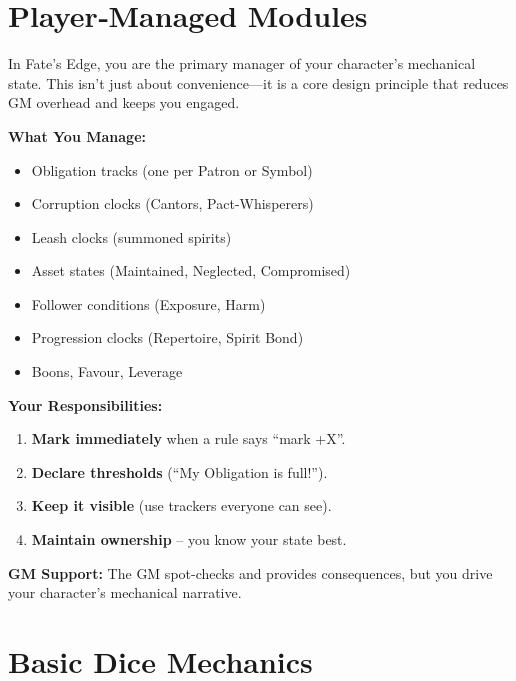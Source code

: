 \section{Player‑Managed Modules}
\label{sec:player-managed-modules}

In Fate’s Edge, you are the primary manager of your character’s mechanical state. This isn’t just about convenience—it is a core design principle that reduces GM overhead and keeps you engaged.

\begin{tcolorbox}[colback=black!3!white,colframe=black!40!white,title=You Track Your Own Story]
\textbf{What You Manage:}
\begin{itemize}
    \item Obligation tracks (one per Patron or Symbol)
    \item Corruption clocks (Cantors, Pact-Whisperers)
    \item Leash clocks (summoned spirits)
    \item Asset states (Maintained, Neglected, Compromised)
    \item Follower conditions (Exposure, Harm)
    \item Progression clocks (Repertoire, Spirit Bond)
    \item Boons, Favour, Leverage
\end{itemize}

\textbf{Your Responsibilities:}
\begin{enumerate}
    \item \textbf{Mark immediately} when a rule says “mark +X”.
    \item \textbf{Declare thresholds} (“My Obligation is full!”).
    \item \textbf{Keep it visible} (use trackers everyone can see).
    \item \textbf{Maintain ownership} – you know your state best.
\end{enumerate}

\textbf{GM Support:} The GM spot-checks and provides consequences, but you drive your character’s mechanical narrative.
\end{tcolorbox}

\section{Basic Dice Mechanics}
\label{sec:dice-mechanics}

